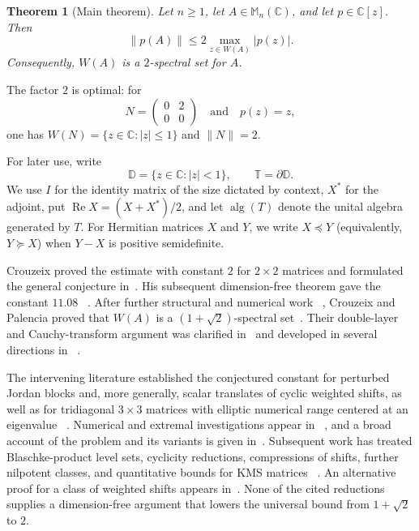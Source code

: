 \documentclass{aomart}
\newtheorem{theorem}{Theorem}[section]
\theoremstyle{definition}
\newcommand{\C}{\mathbb C}
\newcommand{\D}{\mathbb D}
\newcommand{\Torus}{\mathbb T}
\newcommand{\Mn}{\mathbb M_n(\C)}
\newcommand{\alg}{\operatorname{alg}}
\newcommand{\RePart}{\operatorname{Re}}
\begin{document}
\begin{theorem}[Main theorem]
\label{thm:main}
Let $n\geq1$, let $A\in\Mn$, and let $p\in\C[z]$.  Then
\begin{equation}
  \lVert p(A)\rVert
  \leq2\max_{z\in W(A)}\lvert p(z)\rvert.
  \label{eq:main-bound}
\end{equation}
Consequently, $W(A)$ is a $2$-spectral set for $A$.
\end{theorem}

The factor $2$ is optimal: for
\begin{equation}
  N=\begin{pmatrix}0&2\\0&0\end{pmatrix}
  \quad\text{and}\quad p(z)=z,
  \label{eq:sharp-example}
\end{equation}
one has $W(N)=\{z\in\C:\lvert z\rvert\leq1\}$ and
$\lVert N\rVert=2$.

For later use, write
\[
  \D=\{z\in\C:\lvert z\rvert<1\},
  \qquad
  \Torus=\partial\D.
\]
We use $I$ for the identity matrix of the size dictated by context,
$X^*$ for the adjoint, put $\RePart X=(X+X^*)/2$, and let $\alg(T)$
denote the unital algebra generated by $T$.  For Hermitian matrices
$X$ and $Y$, we write $X\preceq Y$ (equivalently, $Y\succeq X$) when
$Y-X$ is positive semidefinite.

Crouzeix proved the estimate with constant $2$ for $2\times2$ matrices and
formulated the general conjecture in~\cite{Crouzeix2004}.  His
subsequent dimension-free theorem gave the constant $11.08$~%
\cite{Crouzeix2007}.  After further structural and numerical work~%
\cite{Crouzeix2016}, Crouzeix and Palencia proved that $W(A)$ is a
$(1+\sqrt2)$-spectral set~\cite{CrouzeixPalencia2017}.  Their
double-layer and Cauchy-transform argument was clarified in~%
\cite{RansfordSchwenninger2018} and developed in several directions in~%
\cite{CaldwellGreenbaumLi2018,CrouzeixGreenbaum2019}.

The intervening literature established the conjectured constant for
perturbed Jordan blocks and, more generally, scalar translates of
cyclic weighted shifts, as well as for tridiagonal $3\times3$ matrices
with elliptic numerical range centered at an eigenvalue~%
\cite{ChoiGreenbaum2012,Choi2013,GladerKurulaLindstrom2018}.
Numerical and extremal investigations appear in~%
\cite{GreenbaumOverton2018,Li2020}, and a broad account of the problem
and its variants is given in~\cite{BickelEtAl2020}.  Subsequent work
has treated Blaschke-product level sets, cyclicity reductions,
compressions of shifts, further nilpotent classes, and quantitative
bounds for KMS matrices~%
\cite{BickelGorkin2024,OLoughlinVirtanen2024,BickelEtAl2024,
CrouzeixGreenbaumLi2024}.  An alternative proof for a class of weighted shifts
appears in~\cite{CrouzeixGreenbaum2025}.  None of the cited reductions
supplies a dimension-free argument that lowers the universal bound from
$1+\sqrt2$ to $2$.
\end{document}

